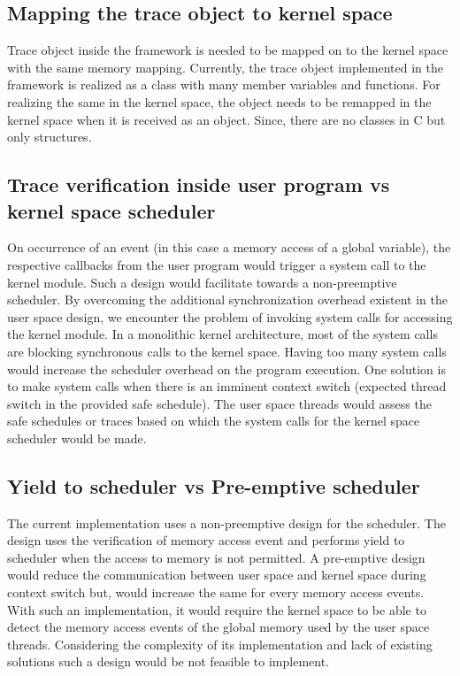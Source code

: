 \documentclass[12pt]{article}
\begin{document}
\subsection*{Mapping the trace object to kernel space}

Trace object inside the framework is needed to be mapped on to the kernel space with the same memory mapping. 
Currently, the trace object implemented in the framework is realized as a class with many member variables and functions. 
For realizing the same in the kernel space, the object needs to be remapped in the kernel space when it is received as an object. 
Since, there are no classes in C but only structures.

\subsection*{Trace verification inside user program vs kernel space scheduler}

On occurrence of an event (in this case a memory access of a global variable), the respective callbacks from the user program would trigger a system call to the kernel module. 
Such a design would facilitate towards a non-preemptive scheduler. 
By overcoming the additional synchronization overhead existent in the user space design, we encounter the problem of invoking system calls for accessing the kernel module. 
In a monolithic kernel architecture, most of the system calls are blocking synchronous calls to the kernel space. 
Having too many system calls would increase the scheduler overhead on the program execution. 
One solution is to make system calls when there is an imminent context switch (expected thread switch in the provided safe schedule). 
The user space threads would assess the safe schedules or traces based on which the system calls for the kernel space scheduler would be made. 

\subsection*{Yield to scheduler vs Pre-emptive scheduler}

The current implementation uses a non-preemptive design for the scheduler. 
The design uses the verification of memory access event and performs yield to scheduler when the access to memory is not permitted. 
A pre-emptive design would reduce the communication between user space and kernel space during context switch but, would increase the same for every memory access events. 
With such an implementation, it would require the kernel space to be able to detect the memory access events of the global memory used by the user space threads. 
Considering the complexity of its implementation and lack of existing solutions such a design would be not feasible to implement. 
\end{document}
